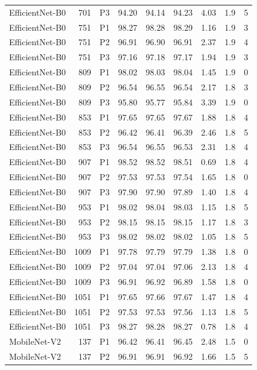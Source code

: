 {\begin{longtable}{lrlrrrrrr}
EfficientNet-B0 & 701 & P3 & 94.20 & 94.14 & 94.23 & 4.03 & 1.9 & 5 \\
EfficientNet-B0 & 751 & P1 & 98.27 & 98.28 & 98.29 & 1.16 & 1.9 & 3 \\
EfficientNet-B0 & 751 & P2 & 96.91 & 96.90 & 96.91 & 2.37 & 1.9 & 4 \\
EfficientNet-B0 & 751 & P3 & 97.16 & 97.18 & 97.17 & 1.94 & 1.9 & 3 \\
EfficientNet-B0 & 809 & P1 & 98.02 & 98.03 & 98.04 & 1.45 & 1.9 & 0 \\
EfficientNet-B0 & 809 & P2 & 96.54 & 96.55 & 96.54 & 2.17 & 1.8 & 3 \\
EfficientNet-B0 & 809 & P3 & 95.80 & 95.77 & 95.84 & 3.39 & 1.9 & 0 \\
EfficientNet-B0 & 853 & P1 & 97.65 & 97.65 & 97.67 & 1.88 & 1.8 & 4 \\
EfficientNet-B0 & 853 & P2 & 96.42 & 96.41 & 96.39 & 2.46 & 1.8 & 5 \\
EfficientNet-B0 & 853 & P3 & 96.54 & 96.55 & 96.53 & 2.31 & 1.8 & 4 \\
EfficientNet-B0 & 907 & P1 & 98.52 & 98.52 & 98.51 & 0.69 & 1.8 & 4 \\
EfficientNet-B0 & 907 & P2 & 97.53 & 97.53 & 97.54 & 1.65 & 1.8 & 0 \\
EfficientNet-B0 & 907 & P3 & 97.90 & 97.90 & 97.89 & 1.40 & 1.8 & 4 \\
EfficientNet-B0 & 953 & P1 & 98.02 & 98.04 & 98.03 & 1.15 & 1.8 & 5 \\
EfficientNet-B0 & 953 & P2 & 98.15 & 98.15 & 98.15 & 1.17 & 1.8 & 3 \\
EfficientNet-B0 & 953 & P3 & 98.02 & 98.02 & 98.02 & 1.05 & 1.8 & 5 \\
EfficientNet-B0 & 1009 & P1 & 97.78 & 97.79 & 97.79 & 1.38 & 1.8 & 0 \\
EfficientNet-B0 & 1009 & P2 & 97.04 & 97.04 & 97.06 & 2.13 & 1.8 & 4 \\
EfficientNet-B0 & 1009 & P3 & 96.91 & 96.92 & 96.89 & 1.58 & 1.8 & 0 \\
EfficientNet-B0 & 1051 & P1 & 97.65 & 97.66 & 97.67 & 1.47 & 1.8 & 4 \\
EfficientNet-B0 & 1051 & P2 & 97.53 & 97.53 & 97.56 & 1.13 & 1.8 & 5 \\
EfficientNet-B0 & 1051 & P3 & 98.27 & 98.28 & 98.27 & 0.78 & 1.8 & 4 \\
MobileNet-V2 & 137 & P1 & 96.42 & 96.41 & 96.45 & 2.48 & 1.5 & 0 \\
MobileNet-V2 & 137 & P2 & 96.91 & 96.91 & 96.92 & 1.66 & 1.5 & 5 \\

\end{longtable}}
